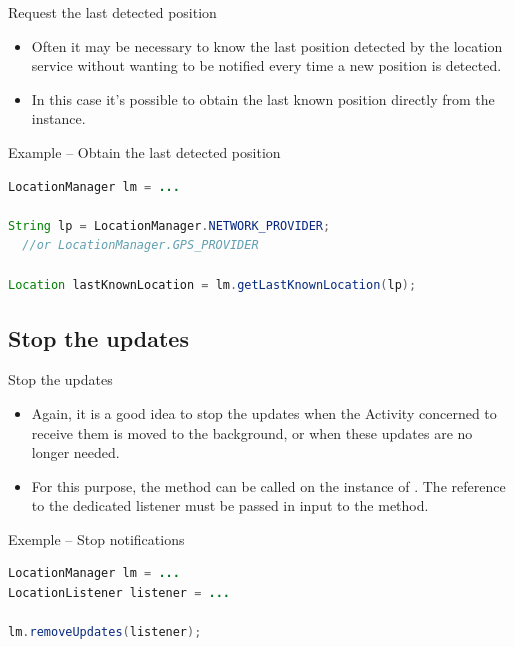 \documentclass{beamer}
\begin{document}
  \begin{frame}[fragile]{Request the last detected position}
    \begin{itemize}
      \item Often it may be necessary to know the last position detected by the
      location service without wanting to be notified every time a new position is
      detected.
      \item In this case it's possible to obtain the last known position directly
      from the  instance. 
    \end{itemize}

    \begin{exampleblock}{Example -- Obtain the last detected position}
      \begin{lstlisting}[language=Java]
LocationManager lm = ...

String lp = LocationManager.NETWORK_PROVIDER;
  //or LocationManager.GPS_PROVIDER

Location lastKnownLocation = lm.getLastKnownLocation(lp);
      \end{lstlisting}
    \end{exampleblock}
  \end{frame}

\subsection*{Stop the updates}

  \begin{frame}[fragile]{Stop the updates}
    \begin{itemize}\itemsep10pt
      \item Again, it is a good idea to stop the updates when the Activity
      concerned to receive them is moved to the background, or when these
      updates are no longer needed.
      \item For this purpose, the  method can be called
      on the instance of . The reference to the dedicated
      listener must be passed in input to the method.
    \end{itemize}

    \begin{exampleblock}{Exemple -- Stop notifications}
      \begin{lstlisting}[language=Java]
LocationManager lm = ...
LocationListener listener = ...

lm.removeUpdates(listener);
      \end{lstlisting}
    \end{exampleblock}
  \end{frame}
\end{document}
